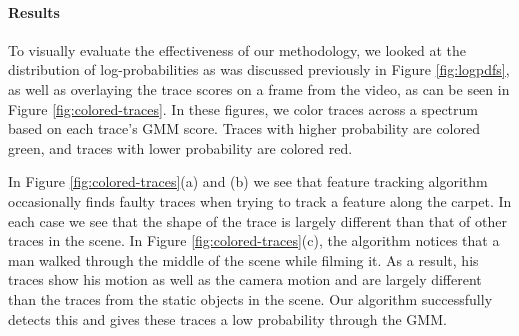 \paragraph{Results} 

To visually evaluate the effectiveness of our methodology, we looked at the
distribution of log-probabilities as was discussed previously in Figure
\ref{fig:logpdfs}, as well as overlaying the trace scores on a frame from the
video, as can be seen in Figure \ref{fig:colored-traces}.  In these figures, we
color traces across a spectrum based on each trace's GMM score.  Traces with
higher probability are colored green, and traces with lower probability are
colored red. 

In Figure \ref{fig:colored-traces}(a) and (b) we see that feature tracking
algorithm occasionally finds faulty traces when trying to track a feature along
the carpet.  In each case we see that the shape of the trace is largely
different than that of other traces in the scene.  In Figure
\ref{fig:colored-traces}(c), the algorithm notices that a man walked through
the middle of the scene while filming it.  As a result, his traces show his
motion as well as the camera motion and are largely different than the traces
from the static objects in the scene.  Our algorithm successfully detects this
and gives these traces a low probability through the GMM.

